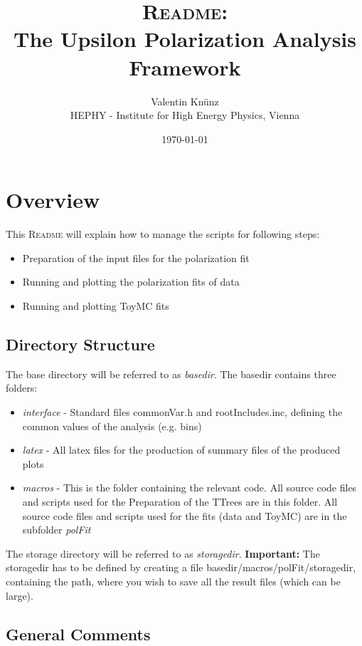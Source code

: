 \documentclass{article}
\begin{document}
\title{\textsc{Readme}:\\The Upsilon Polarization Analysis Framework}
\author{Valentin Kn\"unz\\HEPHY - Institute for High Energy Physics, Vienna}
\date{\today}
\maketitle  


\tableofcontents
\newpage


\section{Overview}

This \textsc{Readme} will explain how to manage the scripts for following steps:
\begin{itemize}
\item{Preparation of the input files for the polarization fit}
\item{Running and plotting the polarization fits of data}
\item{Running and plotting ToyMC fits}
\end{itemize}

\subsection{Directory Structure}
The base directory will be referred to as \emph{basedir}. The basedir contains three folders:
\begin{itemize}
\item{\emph{interface} - Standard files commonVar.h and rootIncludes.inc, defining the common values of the analysis (e.g. bins)}
\item{\emph{latex} - All latex files for the production of summary files of the produced plots}
\item{\emph{macros} - This is the folder containing the relevant code. All source code files and scripts used for the Preparation of the TTrees are in this folder. All source code files and scripts used for the fits (data and ToyMC) are in the subfolder \emph{polFit}}
\end{itemize}
The storage directory will be referred to as \emph{storagedir}. {\bf Important:} The storagedir has to be defined by creating a file basedir/macros/polFit/storagedir, containing the path, where you wish to save all the result files (which can be large). 

\subsection{General Comments}
\end{document}
